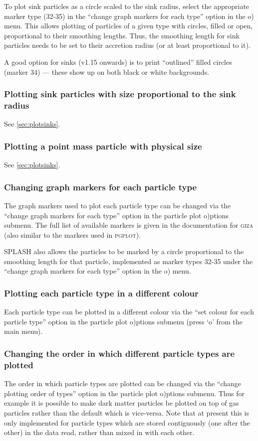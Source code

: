 \documentclass[a4paper,10pt]{article}
\newcommand{\giza}{\textsc{giza }}
\begin{document}
  To plot sink particles as a circle scaled to the sink radius, select the appropriate marker type (32-35) in the ``change graph markers for each type'' option in the o) menu. This allows plotting of particles of a given type with circles, filled or open, proportional to their smoothing lengths. Thus, the smoothing length for sink particles needs to be set to their accretion radius (or at least proportional to it).
  
   A good option for sinks (v1.15 onwards) is to print ``outlined'' filled circles (marker 34) --- these show up on both black or white backgrounds.

\subsubsection{ Plotting sink particles with size proportional to the sink radius}
See \ref{sec:plotsinks}.

\subsubsection{ Plotting a point mass particle with physical size}
See \ref{sec:plotsinks}.

\subsubsection{ Changing graph markers for each particle type}
 The graph markers used to plot each particle type can be changed via the ``change graph markers for each type'' option in the particle plot o)ptions submenu. The full list of available markers is given in the documentation for \giza (also similar to the markers used in \textsc{pgplot}). 
 
  SPLASH also allows the particles to be marked by a circle proportional to the smoothing length for that particle, implemented as marker types 32-35 under the ``change graph markers for each type'' option in the o) menu.

\subsubsection{ Plotting each particle type in a different colour}
\label{sec:partcolours}
 Each particle type can be plotted in a different colour via the ``set colour for each particle type'' option in the particle plot o)ptions submenu (press `o' from the main menu).
 
\subsubsection{ Changing the order in which different particle types are plotted}
 The order in which particle types are plotted can be changed via the ``change plotting order of types'' option in the particle plot o)ptions submenu. Thus for example it is possible to make dark matter particles be plotted on top of gas particles rather than the default which is vice-versa. Note that at present this is only implemented for particle types which are stored contiguously (one after the other) in the data read, rather than mixed in with each other.
\end{document}
